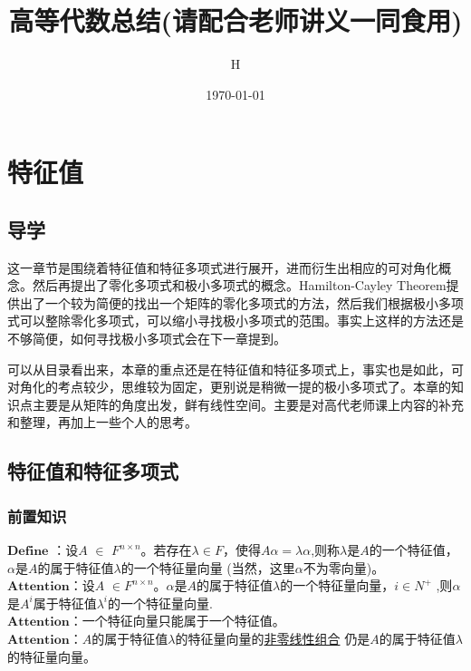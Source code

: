\documentclass[a4paper,12pt]{book}
\begin{document}
\author{H}
\title{高等代数总结(请配合老师讲义一同食用)}
\date{\today}

\frontmatter
\maketitle
\tableofcontents

\mainmatter
\chapter{特征值}
\section{导学}

这一章节是围绕着特征值和特征多项式进行展开，进而衍生出相应的可对角化概念。然后再提出了零化多项式和极小多项式的概念。Hamilton-Cayley Theorem提供出了一个较为简便的找出一个矩阵的零化多项式的方法，然后我们根据极小多项式可以整除零化多项式，可以缩小寻找极小多项式的范围。事实上这样的方法还是不够简便，如何寻找极小多项式会在下一章提到。

可以从目录看出来，本章的重点还是在特征值和特征多项式上，事实也是如此，可对角化的考点较少，思维较为固定，更别说是稍微一提的极小多项式了。本章的知识点主要是从矩阵的角度出发，鲜有线性空间。主要是对高代老师课上内容的补充和整理，再加上一些个人的思考。
\section{特征值和特征多项式}
\subsection{前置知识}
$\mathbf{Define}$ ：设$\mathit{A}$ $\in$ $\mathit{F^{n\times n} }$。若存在$\lambda \in\mathit{F}$，使得$\mathit{A\alpha = \lambda\alpha}$,则称$\lambda$是$\mathit{A}$的一个特征值，$\alpha$是$\mathit{A}$的属于特征值$\lambda$的一个特征量向量 (当然，这里$\alpha$不为零向量)。
~\\


$\mathbf{Attention}$：设$\mathit{A}$ $\in$$\mathit{F^{n\times n} }$。$\alpha$是$\mathit{A}$的属于特征值$\lambda$的一个特征量向量，$\mathit{i} \in\mathit{N^{+} }$ ,则$\alpha$是$\mathit{A^{\mathit{i}} }$属于特征值$\mathit{\lambda^{\mathit{i}} }$的一个特征量向量.	~\\

$\mathbf{Attention}$：一个特征向量只能属于一个特征值。
~\\

$\mathbf{Attention}$：$\mathit{A}$的属于特征值$\lambda$的特征量向量的\underline{非零线性组合} 仍是$\mathit{A}$的属于特征值$\lambda$的特征量向量。
\end{document}
